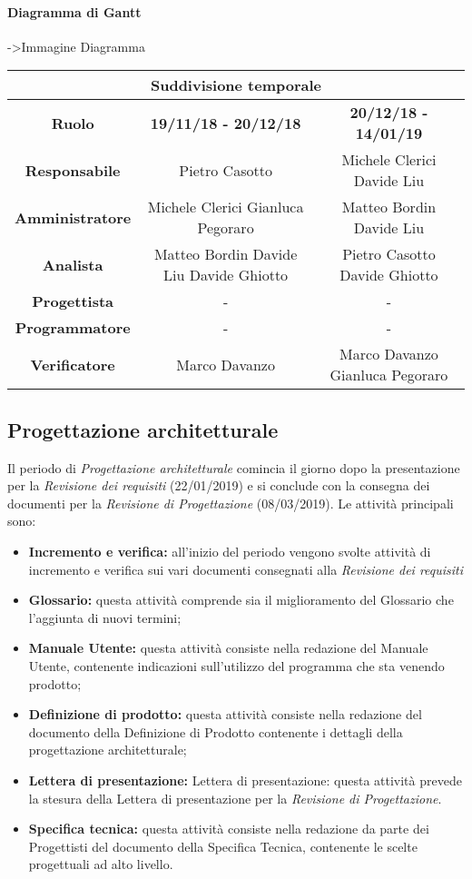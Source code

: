 	\paragraph{Diagramma di Gantt}
	->Immagine Diagramma
	

	\begin{tabularx}{\textwidth}{|c|c|c|}
		\hline
		\multicolumn{3}{|c|}{\textbf{Suddivisione temporale}}\\
		\hline
		\textbf{Ruolo} & \textbf{19/11/18 - 20/12/18} & \textbf{20/12/18 - 14/01/19} \\
		\hline
		\textbf{Responsabile} & Pietro Casotto  & Michele Clerici \linebreak Davide Liu  \\
		\hline
		\textbf{Amministratore} & Michele Clerici  Gianluca Pegoraro & Matteo Bordin Davide Liu \\
		\hline
		\textbf{Analista} & Matteo Bordin Davide Liu Davide Ghiotto & Pietro Casotto Davide Ghiotto \\
		\hline
		\textbf{Progettista} & - & - \\
		\hline
		\textbf{Programmatore} & - & - \\
		\hline
		\textbf{Verificatore} & Marco Davanzo & Marco Davanzo Gianluca Pegoraro \\
		\hline
	\end{tabularx}
	
	\subsection{Progettazione architetturale}
	Il periodo di \textit{Progettazione architetturale} comincia il giorno dopo la presentazione per la \textit{Revisione dei requisiti} (22/01/2019) e si conclude con la consegna dei documenti per la \textit{Revisione di Progettazione} (08/03/2019). Le attività principali sono:
	\begin{itemize}
		\item{\textbf{Incremento e verifica:} all'inizio del periodo vengono svolte attività di incremento e verifica sui vari documenti consegnati alla \textit{Revisione dei requisiti}}
		\item{\textbf{Glossario:} questa attività comprende sia il miglioramento del Glossario che l’aggiunta di nuovi termini;}
		\item{\textbf{Manuale Utente:}  questa attività consiste nella redazione del Manuale Utente, contenente indicazioni sull’utilizzo del programma che sta venendo prodotto;}
		\item{\textbf{Definizione di prodotto:} questa attività consiste nella redazione del documento della Definizione di Prodotto contenente i dettagli della progettazione architetturale;}
		\item{\textbf{Lettera di presentazione:} Lettera di presentazione: questa attività prevede la stesura della Lettera di presentazione per la \textit{Revisione di Progettazione}.}
		\item{\textbf{Specifica tecnica:} questa attività consiste nella redazione da parte dei Progettisti del documento della Specifica Tecnica, contenente le scelte progettuali ad alto livello.}
	\end{itemize}

